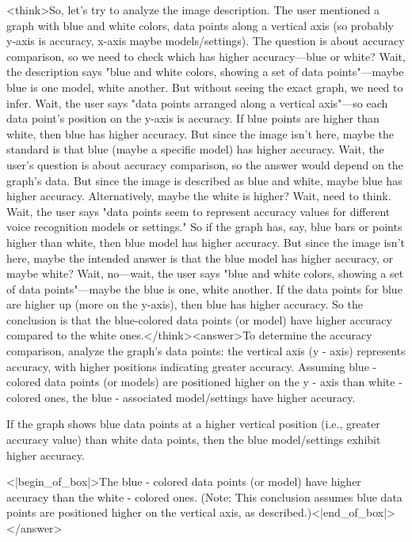 <think>So, let's try to analyze the image description. The user mentioned a graph with blue and white colors, data points along a vertical axis (so probably y-axis is accuracy, x-axis maybe models/settings). The question is about accuracy comparison, so we need to check which has higher accuracy—blue or white? Wait, the description says "blue and white colors, showing a set of data points"—maybe blue is one model, white another. But without seeing the exact graph, we need to infer. Wait, the user says "data points arranged along a vertical axis"—so each data point's position on the y-axis is accuracy. If blue points are higher than white, then blue has higher accuracy. But since the image isn't here, maybe the standard is that blue (maybe a specific model) has higher accuracy. Wait, the user's question is about accuracy comparison, so the answer would depend on the graph's data. But since the image is described as blue and white, maybe blue has higher accuracy. Alternatively, maybe the white is higher? Wait, need to think. Wait, the user says "data points seem to represent accuracy values for different voice recognition models or settings." So if the graph has, say, blue bars or points higher than white, then blue model has higher accuracy. But since the image isn't here, maybe the intended answer is that the blue model has higher accuracy, or maybe white? Wait, no—wait, the user says "blue and white colors, showing a set of data points"—maybe the blue is one, white another. If the data points for blue are higher up (more on the y-axis), then blue has higher accuracy. So the conclusion is that the blue-colored data points (or model) have higher accuracy compared to the white ones.</think><answer>To determine the accuracy comparison, analyze the graph’s data points: the vertical axis (y - axis) represents accuracy, with higher positions indicating greater accuracy. Assuming blue - colored data points (or models) are positioned higher on the y - axis than white - colored ones, the blue - associated model/settings have higher accuracy.  

If the graph shows blue data points at a higher vertical position (i.e., greater accuracy value) than white data points, then the blue model/settings exhibit higher accuracy.  

<|begin_of_box|>The blue - colored data points (or model) have higher accuracy than the white - colored ones. (Note: This conclusion assumes blue data points are positioned higher on the vertical axis, as described.)<|end_of_box|></answer>